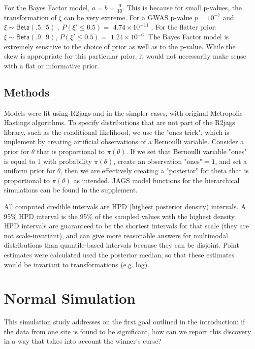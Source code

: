\documentclass[AMA,STIX1COL]{WileyNJD-v2}\usepackage[]{graphicx}\usepackage[]{color}
\begin{document}
For the Bayes Factor model, $a = b= \frac{9}{10}$. This is because for small p-values, the transformation of $\xi$ can be very extreme. For a GWAS p-value $p = 10^{-7}$ and $\xi \sim \textsf{Beta}(.5,.5)$ , $P( \xi' \leq 0.5) =$  $\ensuremath{4.74\times 10^{-11}}$ . For the flatter prior: $\xi \sim \textsf{Beta}(.9,.9)$, $P( \xi' \leq 0.5) =$ $\ensuremath{1.24\times 10^{-6}}$. The Bayes Factor model is extremely sensitive to the choice of prior as well as to the p-value. While the skew is appropriate for this particular prior, it would not necessarily make sense with a flat or informative prior.

\subsection{Methods}

Models were fit using R2jags and in the simpler cases, with original Metropolis Hastings algorithms. To specify distributions that are not part of the R2jags library, such as the conditional likelihood, we use the "ones trick", which is implement by creating artificial observations of a Bernoulli variable. Consider a prior for $\theta$ that is proportional to $\pi(\theta)$. If we set that Bernoulli variable "ones" is equal to 1 with probability $\pi(\theta)$, create an observation "ones"$= 1$, and set a uniform prior for $\theta$, then we are effectively creating a "posterior" for theta that is proportional to  $\pi(\theta)$ as intended. JAGS model functions for the hierarchical simulations can be found in the supplement.

All computed credible intervals are HPD (highest posterior density) intervals. A 95\% HPD interval is the 95\% of the sampled values with the highest density. HPD intervals are guaranteed to be the shortest intervals for that scale (they are not scale-invariant), and can give more reasonable answers for multimodal distributions than quantile-based intervals because they can be disjoint. Point estimates were calculated used the posterior median, so that these estimates would be invariant to transformations (e.g. log).

\section{Normal Simulation}\label{sec:normal}

This simulation study addresses on the first goal outlined in the introduction: if the data from one site is found to be significant, how can we report this discovery in a way that takes into account the winner's curse? 
\end{document}
